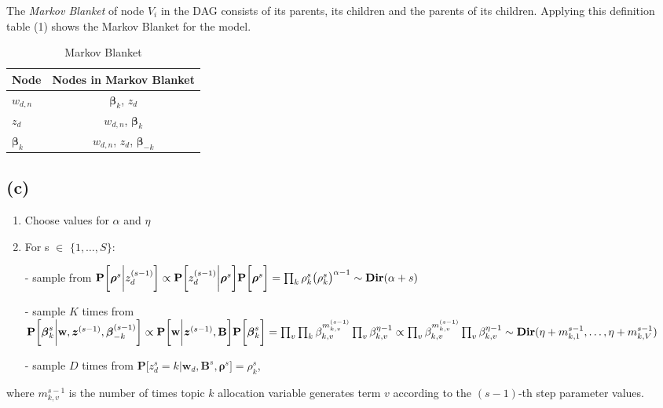 \documentclass[11pt]{article}
\begin{document}
The \textit{Markov Blanket} of node $V_i$ in the DAG consists of its parents, its children and the parents of its children. Applying this definition table (1) shows the Markov Blanket for the model.\\

\begin{table}[!htb]
\centering
\begin{tabular}{ l | c  }
	\textbf{Node} & \textbf{Nodes in Markov Blanket} \\
	\hline
	$w_{d,n}$ & $\boldsymbol{\beta}_k$, $z_d$  \\
	$z_d$& $w_{d,n}$, $\boldsymbol{\beta}_k$  \\
	$\boldsymbol{\beta}_k$&$w_{d,n}$, $z_d$, $\boldsymbol{\beta}_{-k}$
\end{tabular}
\caption{Markov Blanket}
\label{table:tab1}
\end{table}

\subsection*{(c)}

\begin{enumerate}
	\item Choose values for $\alpha$ and $\eta$
	\item For s $\in$ $\{1,\dots,S\}$: 
	\item[-] sample from $\textbf{P}\bigg[\boldsymbol{\rho}^s\bigg|z_d^{(s-1)}\bigg] \propto \textbf{P}\bigg[z_d^{(s-1)}\bigg|\boldsymbol{\rho}^s\bigg]\textbf{P}\bigg[\boldsymbol{\rho}^s\bigg] \\ = \prod_{k}  \rho_k^s \big( \rho_k^s \big)^{\alpha - 1 } \\ \sim \textbf{Dir}(\alpha + s)$
	\item[-]  sample  $K$ times from $\textbf{P}\bigg[\boldsymbol{\beta}_k^s \bigg| \textbf{w}, \boldsymbol{z}^{(s-1)}, \boldsymbol{\beta}_{-k}^{(s-1)} \bigg] \propto  \textbf{P}\bigg[\textbf{w} \bigg| \boldsymbol{z}^{(s-1)}, \textbf{B}\bigg]\textbf{P}\bigg[\boldsymbol{\beta}_k^s \bigg] \\ = \prod_{v}\prod_{k} \beta_{k,v}^{m^{(s-1)}_{k,v} } \prod_{v} \beta_{k,v}^{\eta-1} \propto \prod_{v} \beta_{k,v}^{m^{(s-1)}_{k,v} } \prod_{v} \beta_{k,v}^{\eta-1}  \\ \sim \textbf{Dir}(\eta + m_{k,1}^{s-1},\dots,\eta + m_{k,V}^{s-1}) $
	\item[-] sample $D$ times from $\textbf{P}\bigg[z_d^s = k \bigg| \textbf{w}_d, \textbf{B}^s,\boldsymbol{\rho}^s\bigg] = \rho_k^s$,
\end{enumerate}
where $m_{k,v}^{s-1}$ is the number of times topic $k$ allocation variable generates term $v$ according to the $(s-1)$-th step parameter values. 
\end{document}
